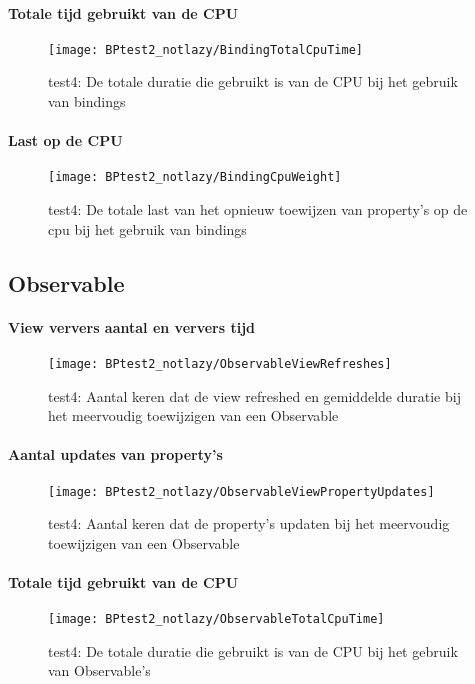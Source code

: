 \paragraph{Totale tijd gebruikt van de CPU}
\begin{figure}[H]
    \centering
    \texttt{[image: BPtest2\_notlazy/BindingTotalCpuTime]} 
    \caption{test4: De totale duratie die gebruikt is van de CPU bij het gebruik van bindings}
    \label{fig:cpuUsageTimeBinding3}
\end{figure}
\paragraph{Last op de CPU}
\begin{figure}[H]
    \centering
    \texttt{[image: BPtest2\_notlazy/BindingCpuWeight]} 
    \caption{test4: De totale last van het opnieuw toewijzen van property's op de cpu bij het gebruik van bindings}
    \label{fig:cpuWeightBinding3}
\end{figure}

\subsection{Observable}
\paragraph{View ververs aantal en ververs tijd}
\begin{figure}[H]
    \centering
    \texttt{[image: BPtest2\_notlazy/ObservableViewRefreshes]} 
    \caption{test4: Aantal keren dat de view refreshed en gemiddelde duratie bij het meervoudig toewijzigen van een Observable}
    \label{fig:viewRefreshesObservable3}
\end{figure}
\paragraph{Aantal updates van property's}
\begin{figure}[H]
    \centering
    \texttt{[image: BPtest2\_notlazy/ObservableViewPropertyUpdates]} 
    \caption{test4: Aantal keren dat de property's updaten bij het meervoudig toewijzigen van een Observable}
    \label{fig:propertyUpdatesObservable3}
\end{figure}
\paragraph{Totale tijd gebruikt van de CPU}
\begin{figure}[H]
    \centering
    \texttt{[image: BPtest2\_notlazy/ObservableTotalCpuTime]} 
    \caption{test4: De totale duratie die gebruikt is van de CPU bij het gebruik van Observable's}
    \label{fig:cpuUsageTimeObservable3}
\end{figure}
